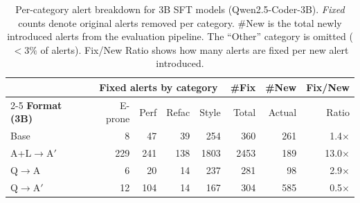 \begin{table}[t]
\centering
\small
\begin{tabular}{l rrrr rr r}
\toprule
& \multicolumn{4}{c}{\textbf{Fixed alerts by category}} & \textbf{\#Fix} & \textbf{\#New} & \textbf{Fix/New} \\
\cmidrule(lr){2-5}
\textbf{Format (3B)} & E-prone & Perf & Refac & Style & Total & Actual & Ratio \\
\midrule
Base & 8 & 47 & 39 & 254 & 360 & 261 & 1.4$\times$ \\
A+L$\rightarrow$A$'$ & 229 & 241 & 138 & 1803 & 2453 & 189 & 13.0$\times$ \\
Q$\rightarrow$A & 6 & 20 & 14 & 237 & 281 & 98 & 2.9$\times$ \\
Q$\rightarrow$A$'$ & 12 & 104 & 14 & 167 & 304 & 585 & 0.5$\times$ \\
\bottomrule
\end{tabular}
\caption{Per-category alert breakdown for 3B SFT models (Qwen2.5-Coder-3B). \emph{Fixed} counts denote original alerts removed per category. \#New is the total newly introduced alerts from the evaluation pipeline. The ``Other'' category is omitted ($<3\%$ of alerts). Fix/New Ratio shows how many alerts are fixed per new alert introduced.}
\label{app:sft_alert_category_breakdown}
\end{table}